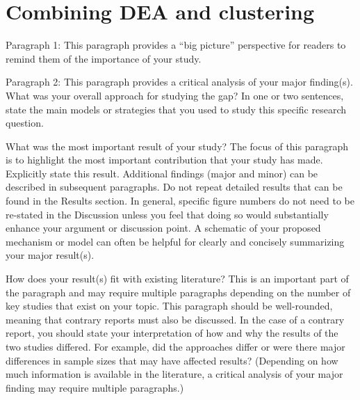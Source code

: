 








\section{Combining DEA and clustering}
Paragraph 1: This paragraph provides a “big picture” perspective for readers to remind them of the importance of your study. 

Paragraph 2: This paragraph provides a critical analysis of your major finding(s). 
What was your overall approach for studying the gap? In one or two sentences, state the main models or strategies that you used to study this specific research question.

What was the most important result of your study? The focus of this paragraph is to highlight the most important contribution that your study has made. Explicitly state this result. Additional findings (major and minor) can be described in subsequent paragraphs. Do not repeat detailed results that can be found in the Results section. In general, specific figure numbers do not need to be re-stated in the Discussion unless you feel that doing so would substantially enhance your argument or discussion point. A schematic of your proposed mechanism or model can often be helpful for clearly and concisely summarizing your major result(s).

How does your result(s) fit with existing literature? This is an important part of the paragraph and may require multiple paragraphs depending on the number of key studies that exist on your topic. This paragraph should be well-rounded, meaning that contrary reports must also be discussed. In the case of a contrary report, you should state your interpretation of how and why the results of the two studies differed. For example, did the approaches differ or were there major differences in sample sizes that may have affected results? (Depending on how much information is available in the literature, a critical analysis of your major finding may require multiple paragraphs.)

